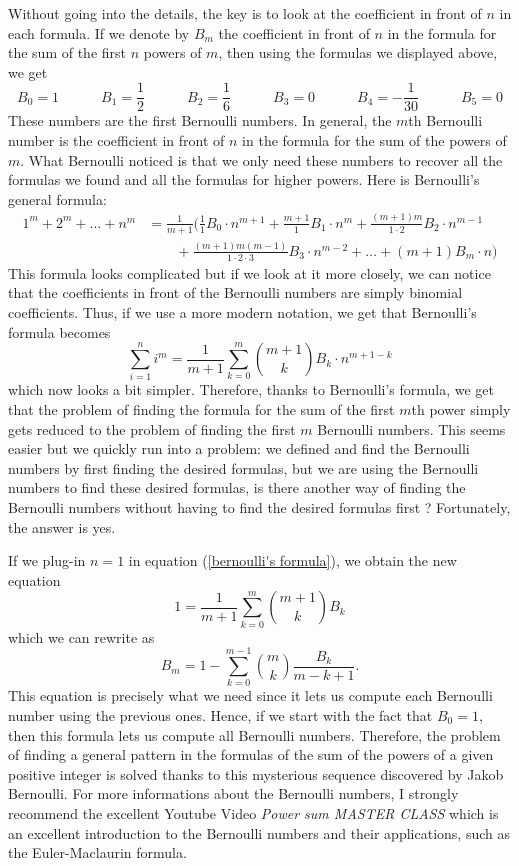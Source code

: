 Without going into the details, the key is to look at the coefficient in front of $n$ in each formula. If we denote by $B_m$ the coefficient in front of $n$ in the formula for the sum of the first $n$ powers of $m$, then using the formulas we displayed above, we get
$$B_0 = 1 \qquad \quad B_1 = \frac{1}{2} \qquad \quad B_2 = \frac{1}{6} \qquad \quad B_3 = 0 \qquad \quad B_4 = -\frac{1}{30} \qquad \quad B_5 = 0$$
These numbers are the first Bernoulli numbers. In general, the $m$th Bernoulli number is the coefficient in front of $n$ in the formula for the sum of the powers of $m$. What Bernoulli noticed is that we only need these numbers to recover all the formulas we found and all the formulas for higher powers. Here is Bernoulli's general formula:
\begin{align*}
    1^m + 2^m + \dots + n^m &= \frac{1}{m+1}\biggl(\frac{1}{1}B_0\cdot n^{m+1} + \frac{m+1}{1}B_1\cdot n^m + \frac{(m+1)m}{1\cdot 2}B_2 \cdot n^{m-1} \\
    &\qquad + \frac{(m+1)m(m-1)}{1\cdot 2\cdot 3}B_3 \cdot n^{m-2} + \dots + (m+1)B_m  \cdot n\biggr)
\end{align*}
This formula looks complicated but if we look at it more closely, we can notice that the coefficients in front of the Bernoulli numbers are simply binomial coefficients. Thus, if we use a more modern notation, we get that Bernoulli's formula becomes
\begin{equation} \label{bernoulli's formula}
    \sum_{i=1}^{n}i^m = \frac{1}{m+1}\sum_{k=0}^{m} \binom{m+1}{k}B_k \cdot n^{m+1-k}
\end{equation}
which now looks a bit simpler. Therefore, thanks to Bernoulli's formula, we get that the problem of finding the formula for the sum of the first $m$th power simply gets reduced to the problem of finding the first $m$ Bernoulli numbers. This seems easier but we quickly run into a problem: we defined and find the Bernoulli numbers by first finding the desired formulas, but we are using the Bernoulli numbers to find these desired formulas, is there another way of finding the Bernoulli numbers without having to find the desired formulas first ? Fortunately, the answer is yes. 

If we plug-in $n = 1$ in equation (\ref{bernoulli's formula}), we obtain the new equation
$$1 = \frac{1}{m+1}\sum_{k=0}^{m}\binom{m+1}{k}B_k$$
which we can rewrite as
\begin{equation}
    B_m = 1 - \sum_{k=0}^{m-1}\binom{m}{k}\frac{B_k}{m-k+1}.
\end{equation}
This equation is precisely what we need since it lets us compute each Bernoulli number using the previous ones. Hence, if we start with the fact that $B_0 = 1$, then this formula lets us compute all Bernoulli numbers. Therefore, the problem of finding a general pattern in the formulas of the sum of the powers of a given positive integer is solved thanks to this mysterious sequence discovered by Jakob Bernoulli. For more informations about the Bernoulli numbers, I strongly recommend the excellent Youtube Video \textit{Power sum MASTER CLASS} \cite{MathologerPowerSum} which is an excellent introduction to the Bernoulli numbers and their applications, such as the Euler-Maclaurin formula. 

